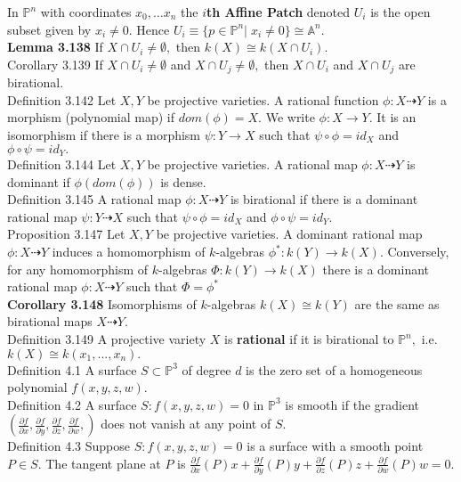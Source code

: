 \documentclass[8pt]{extarticle}
\begin{document}
In $\mathbb{P}^n$ with coordinates $x_0, \dots x_n$ the \textbf{$i$th Affine Patch} denoted $U_i$ is the open subset given by $x_i \neq 0$. Hence $U_i \equiv \{p \in \mathbb{P}^n \vert \; x_i \neq 0\} \cong \mathbb{A}^n$. \\  
\textbf{Lemma 3.138} If $X \cap U_i \neq \emptyset,$ then $k(X) \cong k(X \cap U_i).$\\
Corollary 3.139 If $X \cap U_i \neq \emptyset$ and $X \cap U_j \neq \emptyset,$ then $X \cap U_i$ and $X \cap U_j$ are birational.\\
Definition 3.142 Let $X, Y$ be projective varieties. A rational function $\phi: X \dashrightarrow Y$ is a morphism (polynomial map) if $dom(\phi) = X.$ We write $\phi: X \rightarrow Y.$ It is an isomorphism if there is a morphism $\psi:Y \rightarrow X$ such that $\psi\circ\phi=id_X$ and $\phi\circ\psi=id_Y.$\\
Definition 3.144 Let $X,Y$ be projective varieties. A rational map $\phi: X \dashrightarrow Y$ is dominant if $\phi(dom(\phi))$ is dense.\\
Definition 3.145 A rational map $\phi: X \dashrightarrow Y$ is birational if there is a dominant rational map $\psi: Y \dashrightarrow X$ such that $\psi\circ\phi=id_X$ and $\phi\circ\psi=id_Y.$\\
Proposition 3.147 Let $X,Y$ be projective varieties. A dominant rational map $\phi:X \dashrightarrow Y$ induces a homomorphism of $k$-algebras $\phi^*: k(Y) \rightarrow k(X).$ Conversely, for any homomorphism of $k$-algebras $\Phi: k(Y) \rightarrow k(X)$ there is a dominant rational map $\phi: X \dashrightarrow Y$ such that $\Phi=\phi^*$\\
\textbf{Corollary 3.148} Isomorphisms of $k$-algebras $k(X) \cong k(Y)$ are the same as birational maps $X \dashrightarrow Y.$\\
Definition 3.149 A projective variety $X$ is \textbf{rational} if it is birational to $\mathbb{P}^n,$ i.e. $k(X) \cong k(x_1,..., x_n).$\\
Definition 4.1 A surface $S\subset \mathbb{P}^3$ of degree $d$ is the zero set of a homogeneous polynomial $f(x,y,z,w).$\\
Definition 4.2 A surface $S:f(x,y,z,w)=0$ in $\mathbb{P}^3$ is smooth if the gradient $(\frac{\partial f}{\partial x},\frac{\partial f}{\partial y},\frac{\partial f}{\partial z},\frac{\partial f}{\partial w},)$ does not vanish at any point of $S.$\\
Definition 4.3 Suppose $S:f(x,y,z,w)=0$ is a surface with a smooth point $P \in S.$ The tangent plane at $P$ is $\frac{\partial f}{\partial x}(P)x+\frac{\partial f}{\partial y}(P)y+\frac{\partial f}{\partial z}(P)z+\frac{\partial f}{\partial w}(P)w=0.$\\
\end{document}
